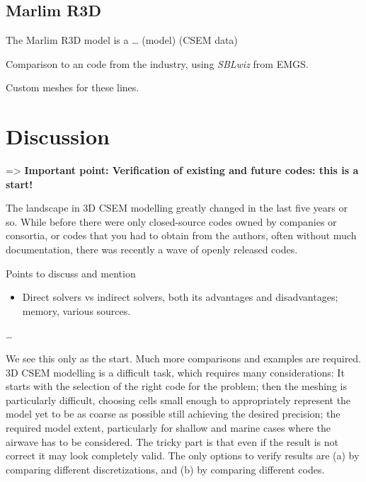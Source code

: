 \documentclass[
    paper,
  ]{geophysics}
\begin{document}
%
%

%
%

%
%


\clearpage  %
\subsection{Marlim R3D}

The Marlim R3D model is a \dots \cite{BJG.17.Carvalho} (model)
\cite{GEO.19.Correa} (CSEM data)

Comparison to an code from the industry, using \emph{SBLwiz} from EMGS.

Custom meshes for these lines.



\clearpage  %
\section{Discussion}

=> \textbf{Important point: Verification of existing and future codes: this is
a start!}

The landscape in 3D CSEM modelling greatly changed in the last five years or
so. While before there were only closed-source codes owned by companies or
consortia, or codes that you had to obtain from the authors, often
without much documentation, there was recently a wave of openly released codes.


Points to discuss and mention
\begin{itemize}
  \item Direct solvers vs indirect solvers, both its advantages and
    disadvantages; memory, various sources.
\end{itemize}

\dots

We see this only as the start. Much more comparisons and examples are required.
3D CSEM modelling is a difficult task, which requires many considerations: It
starts with the selection of the right code for the problem; then the meshing
is particularly difficult, choosing cells small enough to appropriately
represent the model yet to be as coarse as possible still achieving the desired
precision; the required model extent, particularly for shallow and marine cases
where the airwave has to be considered. The tricky part is that even if the
result is not correct it may look completely valid. The only options to verify
results are (a) by comparing different discretizations, and (b) by comparing
different codes.
\end{document}
